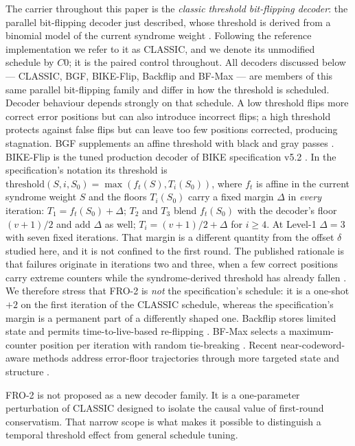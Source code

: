 \documentclass[lettersize,journal]{IEEEtran}
\begin{document}
The carrier throughout this paper is the \emph{classic threshold bit-flipping decoder}: the parallel bit-flipping decoder just described, whose threshold is derived from a binomial model of the current syndrome weight \cite{misoczki2013mdpc,vasseur2021thesis}. Following the reference implementation we refer to it as CLASSIC, and we denote its unmodified schedule by $C0$; it is the paired control throughout. All decoders discussed below --- CLASSIC, BGF, BIKE-Flip, Backflip and BF-Max --- are members of this same parallel bit-flipping family and differ in how the threshold is scheduled. Decoder behaviour depends strongly on that schedule. A low threshold flips more correct error positions but can also introduce incorrect flips; a high threshold protects against false flips but can leave too few positions corrected, producing stagnation. BGF supplements an affine threshold with black and gray passes \cite{drucker2020shades}. BIKE-Flip is the tuned production decoder of BIKE specification v5.2 \cite{bike2024spec}. In the specification's notation its threshold is $\mathrm{threshold}(S,i,S_0)=\max(f_t(S),T_i(S_0))$, where $f_t$ is affine in the current syndrome weight $S$ and the floors $T_i(S_0)$ carry a fixed margin $\Delta$ in \emph{every} iteration: $T_1=f_t(S_0)+\Delta$; $T_2$ and $T_3$ blend $f_t(S_0)$ with the decoder's floor $(v{+}1)/2$ and add $\Delta$ as well; $T_i=(v{+}1)/2+\Delta$ for $i\ge4$. At Level-1 $\Delta=3$ with seven fixed iterations. That margin is a different quantity from the offset $\delta$ studied here, and it is not confined to the first round. The published rationale is that failures originate in iterations two and three, when a few correct positions carry extreme counters while the syndrome-derived threshold has already fallen \cite{sendrier2024seminar}. We therefore stress that FRO-2 is \emph{not} the specification's schedule: it is a one-shot $+2$ on the first iteration of the CLASSIC schedule, whereas the specification's margin is a permanent part of a differently shaped one. Backflip stores limited state and permits time-to-live-based re-flipping \cite{sendrier2020lowdfr}. BF-Max selects a maximum-counter position per iteration with random tie-breaking \cite{baldelli2025bfmax}. Recent near-codeword-aware methods address error-floor trajectories through more targeted state and structure \cite{baldelli2026ncw,santini2026flip}.

FRO-2 is not proposed as a new decoder family. It is a one-parameter perturbation of CLASSIC designed to isolate the causal value of first-round conservatism. That narrow scope is what makes it possible to distinguish a temporal threshold effect from general schedule tuning.
\end{document}
